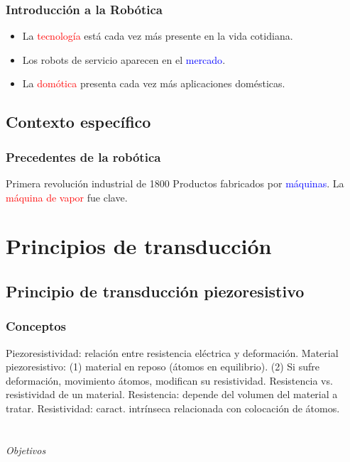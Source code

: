\documentclass{beamer}
\begin{document}
\begin{frame}
\frametitle{Introducción a la Robótica}
\begin{itemize}
\item La \textcolor{red}{tecnología} está cada vez más presente en la vida cotidiana.
\item Los robots de servicio aparecen en el \textcolor{blue}{mercado}.
\item La \textcolor{red}{domótica} presenta cada vez más aplicaciones domésticas.
\end{itemize}
\end{frame}

\subsection{Contexto específico}
\begin{frame}
\frametitle{Precedentes de la robótica}
\begin{block}{Primera revolución industrial de 1800}
Productos fabricados por \textcolor{blue}{máquinas}. La \textcolor{red}{máquina de vapor} fue clave.
\end{block}
\end{frame}

\section{Principios de transducción}
\subsection{Principio de transducción piezoresistivo}
\begin{frame}
\frametitle{Conceptos}
\begin{outline}
\1 Piezoresistividad: relación entre resistencia eléctrica y deformación.
\2 Material piezoresistivo: (1) material en reposo (átomos en equilibrio).
\3 (2) Si sufre deformación, movimiento átomos, modifican su resistividad.
\2 Resistencia vs. resistividad de un material.
\3 Resistencia: depende del volumen del material a tratar.
\3 Resistividad: caract. intrínseca relacionada con colocación de átomos.
\end{outline}
\end{frame}

\section*{}
\begin{frame}{}
  \centering \Huge
  \emph{Objetivos}
\end{frame}
\end{document}
